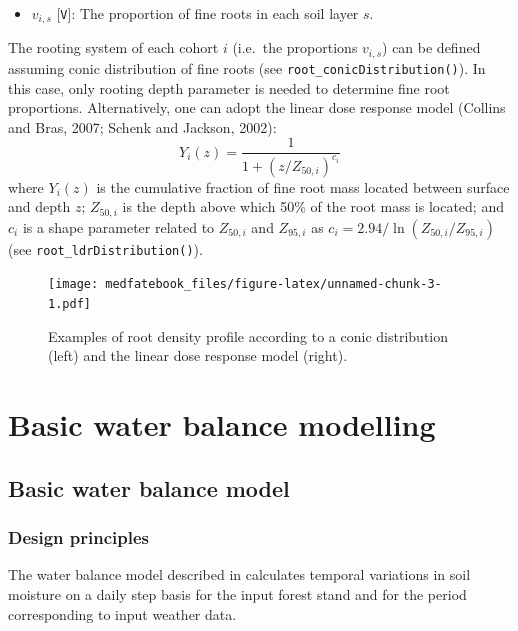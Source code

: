 \documentclass[]{book}
\providecommand{\tightlist}{%
  \setlength{\itemsep}{0pt}\setlength{\parskip}{0pt}}
\begin{document}
\begin{itemize}
\tightlist
\item
  \(v_{i,s}\) {[}\texttt{V}{]}: The proportion of fine roots in each soil layer \(s\).
\end{itemize}

The rooting system of each cohort \(i\) (i.e.~the proportions \(v_{i,s}\)) can be defined assuming conic distribution of fine roots (see \texttt{root\_conicDistribution()}). In this case, only rooting depth parameter is needed to determine fine root proportions. Alternatively, one can adopt the linear dose response model (Collins and Bras, 2007; Schenk and Jackson, 2002):
\begin{equation}
Y_i(z)=\frac{1}{1+(z/Z_{50,i})^{c_i}}
\end{equation}
where \(Y_i(z)\) is the cumulative fraction of fine root mass located between surface and depth \(z\); \(Z_{50,i}\) is the depth above which 50\% of the root mass is located; and \(c_i\) is a shape parameter related to \(Z_{50,i}\) and \(Z_{95,i}\) as \(c_i = 2.94 / \ln(Z_{50,i} / Z_{95,i})\) (see \texttt{root\_ldrDistribution()}).

\begin{figure}
\centering
\texttt{[image: medfatebook\_files/figure-latex/unnamed-chunk-3-1.pdf]}
\caption{\label{fig:unnamed-chunk-3}Examples of root density profile according to a conic distribution (left) and the linear dose response model (right).}
\end{figure}

\hypertarget{part-basic-water-balance-modelling}{%
\part{Basic water balance modelling}\label{part-basic-water-balance-modelling}}

\hypertarget{basic-water-balance-model}{%
\chapter{Basic water balance model}\label{basic-water-balance-model}}

\hypertarget{design-principles}{%
\section{Design principles}\label{design-principles}}

The water balance model described in \citet{DeCaceres2015} calculates temporal variations in soil moisture on a daily step basis for the input forest stand and for the period corresponding to input weather data.
\end{document}
